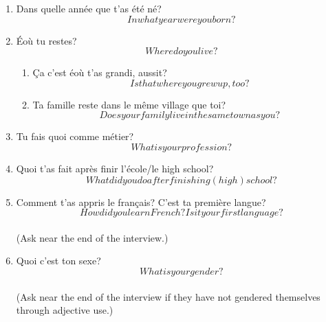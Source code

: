 
\ifdefined \longtrans
\else
  \newcommand{\longtrans}[1]{\[#1\]}
\fi
\newcommand{\setting}[1]{\textbf{#1}}

  \begin{enumerate}
    \subsection{Demographics}
    \item Dans quelle année que t'as été né?\\
      \longtrans{In what year were you born?}
    \item Éoù tu restes?\\
      \longtrans{Where do you live?}
    \begin{enumerate}
      \item Ça c'est éoù t'as grandi, aussit?\\
        \longtrans{Is that where you grew up, too?}
      \item Ta famille reste dans le même village que toi?\\
        \longtrans{Does your family live in the same town as you?}
    \end{enumerate}
    \item Tu fais quoi comme métier?\\
      \longtrans{What is your profession?}
    \item Quoi t'as fait après finir l'école/le high school?\\
      \longtrans{What did you do after finishing (high) school?}
    \item Comment t'as appris le français? C'est ta première langue?\\
      \longtrans{How did you learn French? Is it your first language?}\\
      (Ask near the end of the interview.)
    \item Quoi c'est ton sexe?\\
      \longtrans{What is your gender?}\\
      (Ask near the end of the interview if they have not gendered themselves through adjective use.)

\end{enumerate}
